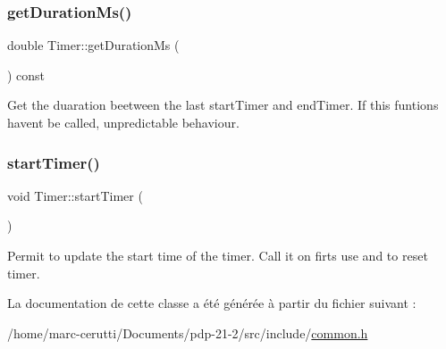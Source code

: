 \subsubsection{\texorpdfstring{get\+Duration\+Ms()}{getDurationMs()}}
{\footnotesize\ttfamily double Timer\+::get\+Duration\+Ms (\begin{DoxyParamCaption}{ }\end{DoxyParamCaption}) const\hspace{0.3cm}{\ttfamily [inline]}}



Get the duaration beetween the last start\+Timer and end\+Timer. If this funtions haven\textquotesingle{}t be called, unpredictable behaviour. 

\mbox{\label{class_timer_aa8c887576ec3b0d68c10ebf4097c367c}} 
\subsubsection{\texorpdfstring{start\+Timer()}{startTimer()}}
{\footnotesize\ttfamily void Timer\+::start\+Timer (\begin{DoxyParamCaption}{ }\end{DoxyParamCaption})\hspace{0.3cm}{\ttfamily [inline]}}



Permit to update the start time of the timer. Call it on firts use and to reset timer. 



La documentation de cette classe a été générée à partir du fichier suivant \+:\begin{DoxyCompactItemize}
\item 
/home/marc-\/cerutti/\+Documents/pdp-\/21-\/2/src/include/\hyperlink{common_8h}{common.\+h}\end{DoxyCompactItemize}
